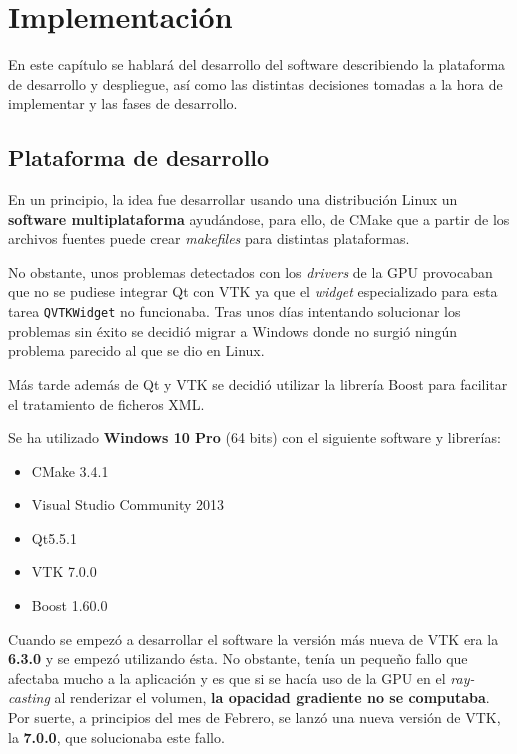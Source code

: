 \chapter{Implementación}

En este capítulo se hablará del desarrollo del software describiendo la plataforma de desarrollo y despliegue, así como las distintas decisiones tomadas a la hora de implementar y las fases de desarrollo.

\section{Plataforma de desarrollo}

En un principio, la idea fue desarrollar usando una distribución Linux un \textbf{software multiplataforma} ayudándose, para ello, de CMake \cite{cmake} que a partir de los archivos fuentes puede crear \textit{makefiles} para distintas plataformas.

No obstante, unos problemas detectados con los \textit{drivers} de la GPU provocaban que no se pudiese integrar Qt \cite{qt} con VTK \cite{vtk} ya que el \textit{widget} especializado para esta tarea \texttt{QVTKWidget} no funcionaba. Tras unos días intentando solucionar los problemas sin éxito se decidió migrar a Windows donde no surgió ningún problema parecido al que se dio en Linux.

Más tarde además de Qt y VTK se decidió utilizar la librería Boost \cite{boost} para facilitar el tratamiento de ficheros XML.

Se ha utilizado \textbf{Windows 10 Pro} (64 bits) con el siguiente software y librerías:

\begin{itemize}
	\item CMake 3.4.1
	\item Visual Studio Community 2013
	\item Qt5.5.1
	\item VTK 7.0.0
	\item Boost 1.60.0
\end{itemize}

Cuando se empezó a desarrollar el software la versión más nueva de VTK era la \textbf{6.3.0} y se empezó utilizando ésta. No obstante, tenía un pequeño fallo que afectaba mucho a la aplicación y es que si se hacía uso de la GPU en el \textit{ray-casting} al renderizar el volumen, \textbf{la opacidad gradiente no se computaba}. Por suerte, a principios del mes de Febrero, se lanzó una nueva versión de VTK, la \textbf{7.0.0}, que solucionaba este fallo.

